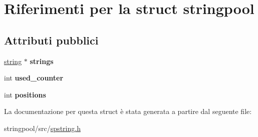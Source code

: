 \hypertarget{structstringpool}{
\section{Riferimenti per la struct stringpool}
\label{structstringpool}
}
\subsection*{Attributi pubblici}
\begin{DoxyCompactItemize}
\item 
\hypertarget{structstringpool_ade9d898bddb2a241d6fa8811c63078cb}{
\hyperlink{structstring}{string} $\ast$ {\bfseries strings}}
\label{structstringpool_ade9d898bddb2a241d6fa8811c63078cb}

\item 
\hypertarget{structstringpool_ae8c4c199ad0a8d10621110791d6d653e}{
int {\bfseries used\_\-counter}}
\label{structstringpool_ae8c4c199ad0a8d10621110791d6d653e}

\item 
\hypertarget{structstringpool_a2cf1860317fee06bf17a8377244be3ee}{
int {\bfseries positions}}
\label{structstringpool_a2cf1860317fee06bf17a8377244be3ee}

\end{DoxyCompactItemize}


La documentazione per questa struct è stata generata a partire dal seguente file:\begin{DoxyCompactItemize}
\item 
stringpool/src/\hyperlink{spstring_8h}{spstring.h}\end{DoxyCompactItemize}
